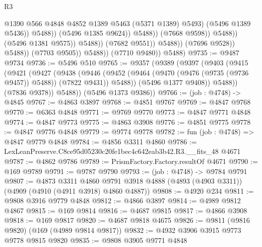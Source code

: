 \begin{lexlean}{R3}
\begin{coremodule}
                                                    @1390
                                                    @566
                                                    @4848
                                                    @4852
                                                    @1389
                                                    @5463
                                                    (@5371 @1389)
                                                    @5493)
                                                  (@5496 @1389 @5436))
                                                @5488))
                                            (@5496 @1385 @9624))
                                          @5488))
                                      (@7668 @9598))
                                    @5488))
                                (@5496 @1381 @9575))
                              @5488))
                          (@7682 @9551))
                        @5488))
                    (@7696 @9528))
                  @5488))
              (@7703 @9505))
            @5488))
        (@7710 @9480))
      @5488)
@9735 := @9487 @9734
@9736 := @5496 @510
@9765 := @9357
    (@9389
      (@9397
        (@9403
          (@9415
            (@9421
              (@9427
                (@9438
                  (@9446
                    (@9452 (@9464 (@9470 (@9476 (@9735 (@9736 @9457)) @5488)) (@7822 @9431)) @5488))
                  (@5496 @1377 @9408))
                @5488))
            (@7836 @9378))
          @5488))
      (@5496 @1373 @9386))
@9766 := (job : @4748) -> @4845
@9767 := @4863 @3897
@9768 := @4851 @9767
@9769 := @4847 @9768
@9770 := @6363 @4848
@9771 := @9769 @9770
@9773 := @4847 @9771 @4848
@9774 := @4847 @9773
@9775 := @4863 @3908
@9776 := @4851 @9775
@9778 := @4847 @9776 @4848
@9779 := @9774 @9778
@9782 := fun (job : @4748) => @4847 @9779 @4848
@9784 := @4856 @3311 @4860
@9786 := LexLeanPreserve.C8ce95d05230c20fe1bec4c642eab3b42.R3.__fits_48 @4671
@9787 := @4862 @9786
@9789 := PrismFactory.Factory.resultOf @4671
@9790 := @169 @9789
@9791 := @9787 @9790
@9793 := (job : @4748) -> @9784 @9791
@9807 := @4873
    @3311
    @4860
    @9791
    @3918
    @4888
    (@4893 (@4903 @3311))
    (@4909 (@4910 (@4911 @3918) @4860 @4887))
@9808 := @4920 @234
@9811 := @9808 @3916 @9779 @4848
@9812 := @4866 @3897
@9814 := @4989 @9812 @4867
@9815 := @169 @9814
@9816 := @4687 @9815
@9817 := @4866 @3908
@9818 := @169 @9817
@9820 := @4687 @9818 @4675
@9826 := @9811 (@9816 @9820) (@169 (@4989 @9814 @9817))
@9832 := @4932 @3906 @3915 @9773 @9778 @9815 @9820
@9835 := @9808 @3905 @9771 @4848

\end{coremodule}
\end{lexlean}
